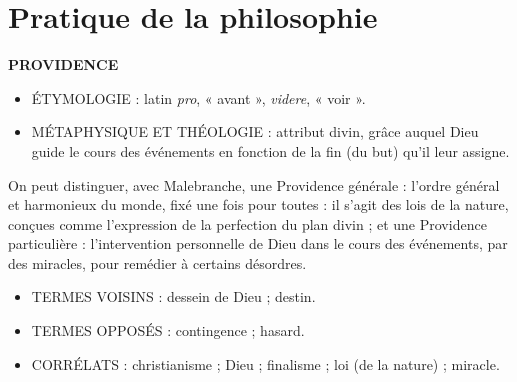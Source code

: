 
\section{Pratique de la philosophie}

{\bf PROVIDENCE}

\begin{itemize}[leftmargin=1cm, label=, itemsep=1pt]
\item {\footnotesize ÉTYMOLOGIE} : latin {\it pro}, « avant », {\it videre}, « voir ».
\item {\footnotesize MÉTAPHYSIQUE ET THÉOLOGIE} : attribut divin, grâce auquel Dieu guide le cours des événements en fonction de la fin (du but) qu'il leur assigne.
\end{itemize}

On peut distinguer, avec Malebranche,
une Providence générale : l’ordre général et harmonieux du monde, fixé une
fois pour toutes : il s’agit des lois de la
nature, conçues comme l'expression de
la perfection du plan divin ; et une Providence particulière : l'intervention personnelle de Dieu dans le cours des événements, par des miracles, pour
remédier à certains désordres.

\begin{itemize}[leftmargin=1cm, label=, itemsep=1pt]
\item {\footnotesize TERMES VOISINS} : dessein de Dieu ; destin.
\item {\footnotesize TERMES OPPOSÉS} : contingence ; hasard.
\item {\footnotesize CORRÉLATS} : christianisme ; Dieu ; finalisme ; loi (de la nature) ; miracle.
\end{itemize}

